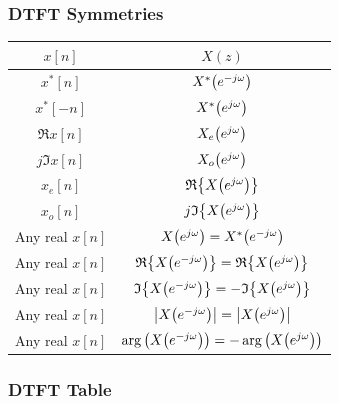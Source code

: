 \documentclass[11pt]{article}
\begin{document}
  \pagebreak

  \subsubsection{DTFT Symmetries}
  \bgroup
  \renewcommand{\arraystretch}{2}
  \setlength{\tabcolsep}{1cm}
  \large\begin{tabular}{c|c}
    \(x[n]\) & \(X(z)\)\\
    \toprule
    \(x^*[n]\) & \(X^*{\left( e^{-j\omega} \right)}\) \\
    \(x^*[-n]\) & \(X^*{\left( e^{j\omega} \right)}\) \\
    \(\Re{x[n]}\) & \(X_e{\left( e^{j\omega} \right)}\) \\
    \(j\Im{x[n]}\) & \(X_o{\left( e^{j\omega} \right)}\) \\
    \(x_e[n]\) & \(\mathfrak{R}{\left\{ X{\left( e^{j\omega} \right)} \right\}}\) \\
    \(x_o[n]\) & \(j\mathfrak{I}{\left\{ X{\left( e^{j\omega} \right)} \right\}}\) \\
    Any real \(x[n]\) & \(X{\left( e^{j\omega} \right)} = X^*{\left( e^{-j\omega} \right)}\) \\
    Any real \(x[n]\) & \(\mathfrak{R}{\left\{ X{\left( e^{-j\omega} \right)} \right\}} =
    \mathfrak{R}{\left\{ X{\left( e^{j\omega} \right)} \right\}}\) \\
    Any real \(x[n]\) & \(\mathfrak{I}{\left\{ X{\left( e^{-j\omega} \right)} \right\}} =
    -\mathfrak{I}{\left\{ X{\left( e^{j\omega} \right)} \right\}}\) \\
    Any real \(x[n]\) & \(\left|X{\left( e^{-j\omega} \right)}\right| =
    \left|X{\left( e^{j\omega} \right)}\right|\) \\
    Any real \(x[n]\) & \(\arg{\left( X{\left( e^{-j\omega} \right)} \right)} =
    -\arg{\left( X{\left( e^{j\omega} \right)} \right)}\) \\
  \end{tabular}
  \egroup

  \pagebreak

  \subsubsection{DTFT Table}
\end{document}
